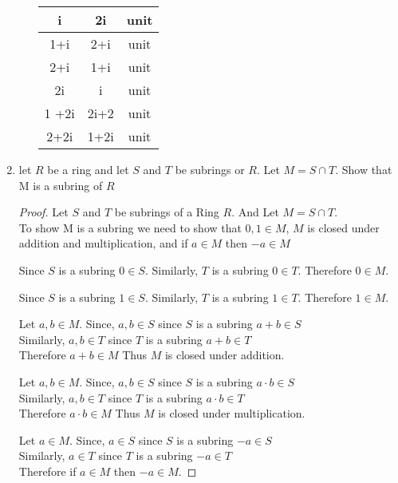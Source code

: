 \documentclass{article}
\begin{document}
\begin{enumerate}
\begin{enumerate}
\begin{table}[htbp]
\begin{tabular}{|c|c|c|}
					i & 2i & unit \\
					\hline
					1+i & 2+i &  unit \\
					\hline
					2+i & 1+i &  unit \\
					\hline
					
					2i & i & unit \\
					\hline
					1 +2i & 2i+2 &  unit \\
					\hline
					2+2i & 1+2i &  unit \\
					\hline
					
				\end{tabular}
			\end{table}
			
		\end{enumerate}
		
		\item let $R$ be a ring and let $S$ and $T$ be subrings or $R$. Let $M = S \cap T$. Show that M is a subring of $R$ 
		\begin{proof}
				Let $S$ and $T$ be subrings of a Ring $R$. And Let $M = S \cap T$.\\ 
				To show M is a subring  we need to show that $ 0, 1 \in M$, $M$ is closed under addition and multiplication, and if $a \in M$ then $-a \in M$ 
				
				Since $S$ is a subring $0 \in S$.
				Similarly, $T$ is a subring $0 \in T$.
				Therefore $0 \in M$.
				
				Since $S$ is a subring $1 \in S$.
				Similarly, $T$ is a subring $1 \in T$.
				Therefore $1 \in M$.
		
				Let $a,b \in M$.
				 Since, $a,b \in S$ since $S$ is a subring $a+b \in S$\\
				 Similarly, $a,b \in T$ since $T$ is a subring $a+b \in T$\\
				Therefore $a+b \in M $ Thus $M$ is closed under addition. 
				
				Let $a,b \in M$.
				Since, $a,b \in S$ since $S$ is a subring $a\cdot b \in S$\\
				Similarly, $a,b \in T$ since $T$ is a subring $a\cdot b \in T$\\
				Therefore $a \cdot b \in M $ Thus $M$ is closed under multiplication.
				
				Let $a \in M$.
				Since, $a\in S$ since $S$ is a subring $-a\in S$\\
				Similarly, $a\in T$ since $T$ is a subring $-a\in T$\\
				Therefore if $a \in M$ then $-a \in M$.
				

\end{proof}
\end{enumerate}
\end{document}
